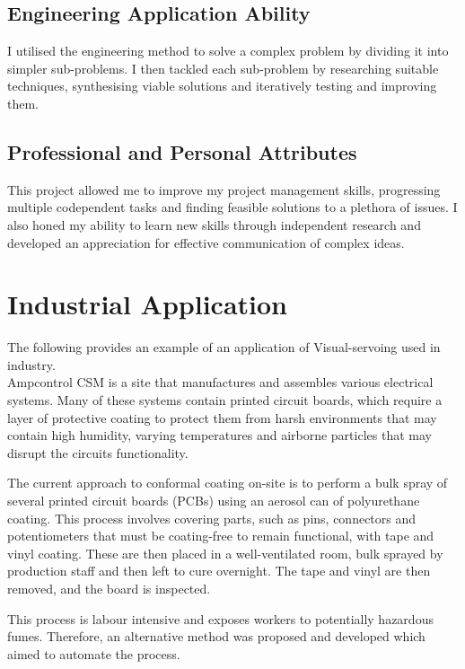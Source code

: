 \documentclass{UoNMCHA}
\numberwithin{equation}{section}
\begin{document}
\subsection{Engineering Application Ability}

I utilised the engineering method to solve a complex problem by dividing it into simpler sub-problems. I then tackled each sub-problem by researching suitable techniques, synthesising viable solutions and iteratively testing and improving them. 

\subsection{Professional and Personal Attributes}

This project allowed me to improve my project management skills, progressing multiple codependent tasks and finding feasible solutions to a plethora of issues. I also honed my ability to learn new skills through independent research and developed an appreciation for effective communication of complex ideas.   


\newpage
\section{Industrial Application}\label{Industrial Application}

The following provides an example of an application of Visual-servoing used in industry. \\ 

Ampcontrol CSM is a site that manufactures and assembles various electrical systems. Many of these systems contain printed circuit boards, which require a layer of protective coating to protect them from harsh environments that may contain high humidity, varying temperatures and airborne particles that may disrupt the circuits functionality. \


The current approach to conformal coating on-site is to perform a bulk spray of several printed circuit boards (PCBs) using an aerosol can of polyurethane coating. This process involves covering parts, such as pins, connectors and potentiometers that must be coating-free to remain functional, with tape and vinyl coating. These are then placed in a well-ventilated room, bulk sprayed by production staff and then left to cure overnight. The tape and vinyl are then removed, and the board is inspected. \


This process is labour intensive and exposes workers to potentially hazardous fumes. Therefore, an alternative method was proposed and developed which aimed to automate the process. \
\end{document}
